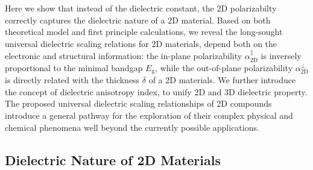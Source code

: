 \documentclass[journal=ancac3,manuscript=article,email=true,hyperref=true,keywords=false]{achemso}
\begin{document}
Here we show that instead of the dielectric constant,
the 2D polarizabilty correctly captures the dielectric nature
of a 2D material. Based on both theoretical model and first principle
calculations, we reveal the long-sought universal dielectric scaling
relations for 2D materials, depend both on the electronic and
structural information: the in-plane polarizability
$\alpha^{\parallel}_{\mathrm{2D}}$ is inversely proportional to the minimal bandgap
$E_{\mathrm{g}}$, while the out-of-plane polarizability
$\alpha^{\perp}_{\mathrm{2D}}$ is directly related with the thickness
$\delta$ of a 2D materials. We further introduce the concept of
dielectric anisotropy index, to unify 2D and 3D dielectric
property. The proposed universal dielectric scaling relationships of
2D compounds introduce a general pathway for the exploration of their
complex physical and chemical phenomena well beyond the currently
possible applications.


\subsection{Dielectric Nature of 2D Materials}
\label{sec:2d}
\end{document}
